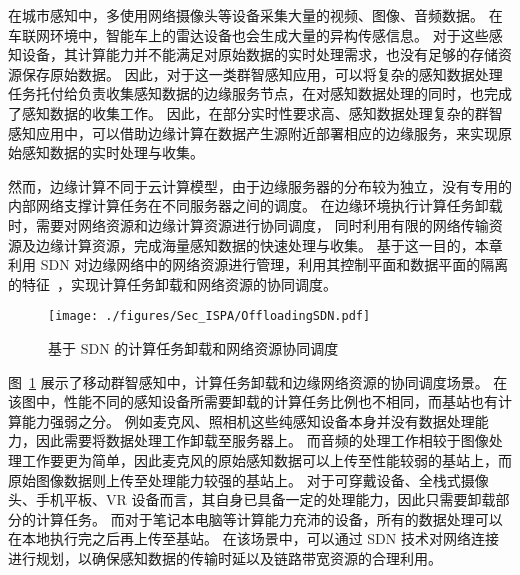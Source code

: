 
在城市感知中，多使用网络摄像头等设备采集大量的视频、图像、音频数据。
在车联网环境中，智能车上的雷达设备也会生成大量的异构传感信息。
对于这些感知设备，其计算能力并不能满足对原始数据的实时处理需求，也没有足够的存储资源保存原始数据。
因此，对于这一类群智感知应用，可以将复杂的感知数据处理任务托付给负责收集感知数据的边缘服务节点，在对感知数据处理的同时，也完成了感知数据的收集工作。
因此，在部分实时性要求高、感知数据处理复杂的群智感知应用中，可以借助边缘计算在数据产生源附近部署相应的边缘服务，来实现原始感知数据的实时处理与收集。

然而，边缘计算不同于云计算模型，由于边缘服务器的分布较为独立，没有专用的内部网络支撑计算任务在不同服务器之间的调度。
在边缘环境执行计算任务卸载时，需要对网络资源和边缘计算资源进行协同调度，
同时利用有限的网络传输资源及边缘计算资源，完成海量感知数据的快速处理与收集。
基于这一目的，本章利用 SDN 对边缘网络中的网络资源进行管理，利用其控制平面和数据平面的隔离的特征~\cite{Committee:2012un}，实现计算任务卸载和网络资源的协同调度。


\begin{figure}[!h]
  \centering
  \texttt{[image: ./figures/Sec\_ISPA/OffloadingSDN.pdf]}
  \vspace{-1em}
  \caption{基于 SDN 的计算任务卸载和网络资源协同调度}
  \vspace{-1em}
  \label{fig_OffloadingSDN}
\end{figure}

图~\ref{fig_OffloadingSDN} 展示了移动群智感知中，计算任务卸载和边缘网络资源的协同调度场景。
在该图中，性能不同的感知设备所需要卸载的计算任务比例也不相同，而基站也有计算能力强弱之分。
例如麦克风、照相机这些纯感知设备本身并没有数据处理能力，因此需要将数据处理工作卸载至服务器上。
而音频的处理工作相较于图像处理工作要更为简单，因此麦克风的原始感知数据可以上传至性能较弱的基站上，而原始图像数据则上传至处理能力较强的基站上。
对于可穿戴设备、全栈式摄像头、手机平板、VR 设备而言，其自身已具备一定的处理能力，因此只需要卸载部分的计算任务。
而对于笔记本电脑等计算能力充沛的设备，所有的数据处理可以在本地执行完之后再上传至基站。
在该场景中，可以通过 SDN 技术对网络连接进行规划，以确保感知数据的传输时延以及链路带宽资源的合理利用。

